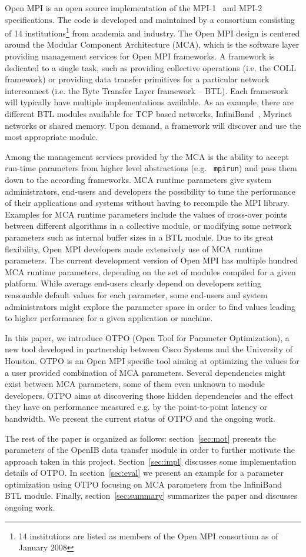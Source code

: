 Open MPI\cite{gabriel:ompi} is an open source implementation of the
MPI-1~\cite{mpi1} and MPI-2~\cite{mpi2} specifications. The code is
developed and maintained by a consortium consisting of 14
institutions\footnote{14 institutions are listed as members of the
Open MPI consortium as of January 2008} from academia and
industry. The Open MPI design is centered around the Modular Component
Architecture (MCA), which is the software layer providing management
services for Open MPI frameworks. A framework is dedicated to a
single task, such as providing collective operations (i.e. the COLL
framework) or providing data transfer primitives for a particular
network interconnect (i.e. the Byte Transfer Layer framework --
BTL). Each framework will typically have multiple implementations
available. As an example, there are different BTL modules available
for TCP based networks, InfiniBand~\cite{ib}, Myrinet networks or
shared memory. Upon demand, a framework will discover and use the most
appropriate module.

Among the management services provided by the MCA is the ability to
accept run-time parameters from higher level abstractions (e.g. {\tt
mpirun}) and pass them down to the according frameworks. MCA runtime
parameters give system administrators, end-users and developers the
possibility to tune the performance of their applications and systems
without having to recompile the MPI library. Examples for MCA runtime
parameters include the values of cross-over points between different 
algorithms in a collective module, or modifying some
network parameters such as internal buffer sizes in a BTL module. Due to its
great flexibility, Open MPI developers made extensively use of MCA runtime parameters.
The current development version of Open MPI has multiple
hundred MCA runtime parameters, depending on the set of modules
compiled for a given platform. While average end-users clearly depend
on developers setting reasonable default values for each parameter,
some end-users and system administrators might explore the
parameter space in order to find values leading to
higher performance for a given application or machine.

In this paper, we introduce OTPO (Open Tool for Parameter
Optimization), a new tool developed in partnership between Cisco
Systems and the University of Houston. OTPO is an Open MPI specific
tool aiming at optimizing the values for a user provided combination
of MCA parameters. Several dependencies might exist between MCA
parameters, some of them even unknown to module developers. OTPO aims
at discovering those hidden dependencies and the effect they have on
performance measured e.g. by the point-to-point latency or
bandwidth. We present the current status of OTPO and the ongoing work.

The rest of the paper is organized as follows: section~\ref{sec:mot}
presents the parameters of the OpenIB data transfer module in order to further motivate the approach taken 
in this project. Section~\ref{sec:impl} discusses some implementation
details of OTPO. In section~\ref{sec:eval} we present an example for a
parameter optimization using OTPO focusing on MCA parameters from the
InfiniBand BTL module. Finally, section~\ref{sec:summary} summarizes
the paper and discusses ongoing work.

